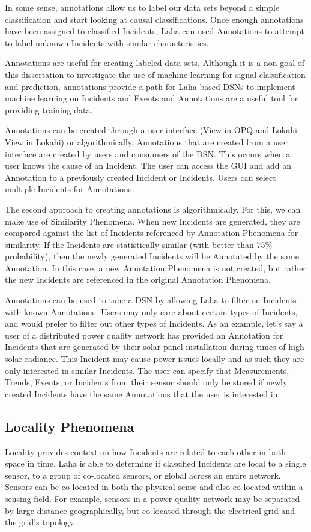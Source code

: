 In some sense, annotations allow us to label our data sets beyond a simple classification and start looking at causal classifications. Once enough annotations have been assigned to classified Incidents, Laha can used Annotations to attempt to label unknown Incidents with similar characteristics.

Annotations are useful for creating labeled data sets. Although it is a non-goal of this dissertation to investigate the use of machine learning for signal classification and prediction, annotations provide a path for Laha-based DSNs to implement machine learning on Incidents and Events and Annotations are a useful tool for providing training data.

Annotations can be created through a user interface (View in OPQ and Lokahi View in Lokahi) or algorithmically. Annotations that are created from a user interface are created by users and consumers of the DSN. This occurs when a user knows the cause of an Incident. The user can access the GUI and add an Annotation to a previously created Incident or Incidents. Users can select multiple Incidents for Annotations.

The second approach to creating annotations is algorithmically. For this, we can make use of Similarity Phenomena. When new Incidents are generated, they are compared against the list of Incidents referenced by Annotation Phenomena for similarity. If the Incidents are statistically similar (with better than 75\% probability), then the newly generated Incidents will be Annotated by the same Annotation. In this case, a new Annotation Phenomena is not created, but rather the new Incidents are referenced in the original Annotation Phenomena.

Annotations can be used to tune a DSN by allowing Laha to filter on Incidents with known Annotations. Users may only care about certain types of Incidents, and would prefer to filter out other types of Incidents. As an example, let's say a user of a distributed power quality network has provided an Annotation for Incidents that are generated by their solar panel installation during times of high solar radiance. This Incident may cause power issues locally and as such they are only interested in similar Incidents. The user can specify that Measurements, Trends, Events, or Incidents from their sensor should only be stored if newly created Incidents have the same Annotations that the user is interested in.

\subsection{Locality Phenomena}\label{subsec:locality-phenomena}
Locality provides context on how Incidents are related to each other in both space in time. Laha is able to determine if classified Incidents are local to a single sensor, to a group of co-located sensors, or global across an entire network. Sensors can be co-located in both the physical sense and also co-located within a sensing field. For example, sensors in a power quality network may be separated by large distance geographically, but co-located through the electrical grid and the grid's topology.

